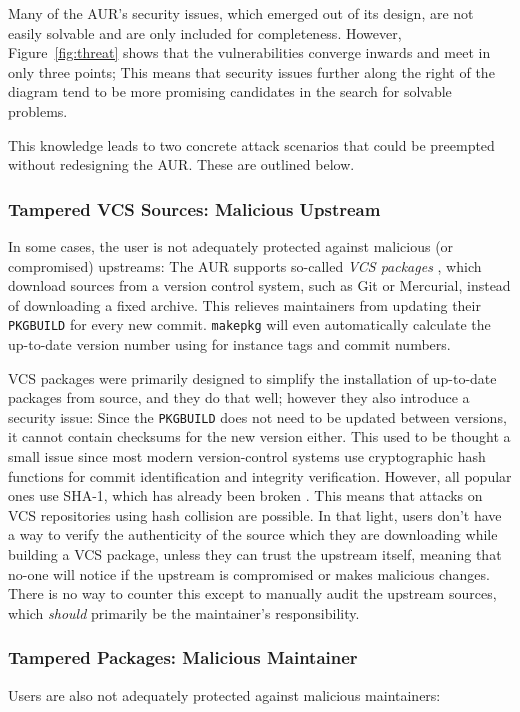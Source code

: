 Many of the AUR's security issues, which emerged out of its design, are not easily solvable and are only included for completeness. However, Figure~\ref{fig:threat} shows that the vulnerabilities converge inwards and meet in only three points; This means that security issues further along the right of the diagram tend to be more promising candidates in the search for solvable problems.

This knowledge leads to two concrete attack scenarios that could be preempted without redesigning the AUR. These are outlined below.

\subsubsection{Tampered VCS Sources: Malicious Upstream}
\label{sec:vcs_attack}
In some cases, the user is not adequately protected against malicious (or compromised) upstreams:
The AUR supports so-called \emph{VCS packages} \cite{wiki:VCSPackages}, which download sources from a version control system, such as Git or Mercurial, instead of downloading a fixed archive. This relieves maintainers from updating their \texttt{PKGBUILD} for every new commit.
\texttt{makepkg} will even automatically calculate the up-to-date version number using for instance tags and commit numbers.

VCS packages were primarily designed to simplify the installation of up-to-date packages from source, and they do that well; however they also introduce a security issue:
Since the \texttt{PKGBUILD} does not need to be updated between versions, it cannot contain checksums for the new version either.
This used to be thought a small issue since most modern version-control systems use cryptographic hash functions for commit identification and integrity verification.
However, all popular ones use SHA-1, which has already been broken \cite{Stevens:2017}.
This means that attacks on VCS repositories using hash collision are possible.
In that light, users don't have a way to verify the authenticity of the source which they are downloading while building a VCS package, unless they can trust the upstream itself, meaning that no-one will notice if the upstream is compromised or makes malicious changes.
There is no way to counter this except to manually audit the upstream sources, which \emph{should} primarily be the maintainer's responsibility.

\subsubsection{Tampered Packages: Malicious Maintainer}
\label{sec:maint_attack}
Users are also not adequately protected against malicious maintainers:

